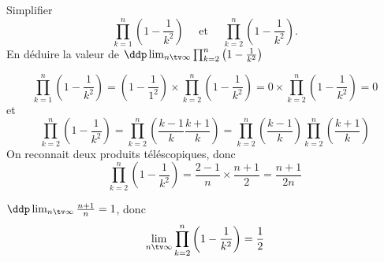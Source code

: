 



\begin{exercice}
Simplifier  
$$\prod_{k=1}^n \left(1-\frac{1}{k^2}\right) \quad \text{ et } \quad \prod_{k=2}^n \left(1-\frac{1}{k^2}\right).$$
En déduire la valeur de $\ddp \lim_{n\tv \infty} \prod_{k=2}^n \left(1-\frac{1}{k^2}\right)$
\end{exercice}




\begin{correction}
$$\prod_{k=1}^n \left(1-\frac{1}{k^2}\right) = \left(1-\frac{1}{1^2}\right) \times \prod_{k=2}^n \left(1-\frac{1}{k^2}\right) =0 \times \prod_{k=2}^n \left(1-\frac{1}{k^2}\right) =0$$
et
$$\prod_{k=2}^n \left(1-\frac{1}{k^2}\right) =\prod_{k=2}^n\left( \frac{k-1}{k}\frac{k+1}{k}\right) = \prod_{k=2}^n\left( \frac{k-1}{k}\right) \prod_{k=2}^n\left(  \frac{k+1}{k}\right) $$ 
On reconnait deux produits téléscopiques, donc 
$$\prod_{k=2}^n \left(1-\frac{1}{k^2}\right)  = \frac{2-1}{n} \times \frac{n+1}{2} =\frac{n+1}{2n}$$

$\ddp \lim_{n\tv \infty} \frac{n+1}{n}=1$, donc 
$$\lim_{n\tv \infty} \prod_{k=2}^n \left(1-\frac{1}{k^2}\right)  =\frac{1}{2}$$

\end{correction}